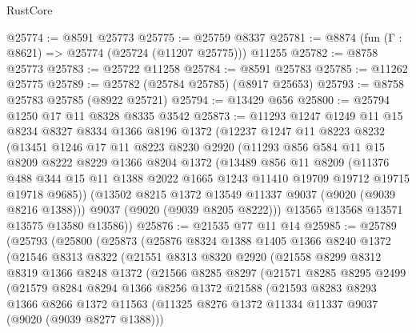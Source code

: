 \begin{lexlean}{RustCore}
\begin{coremodule}
@25774 := @8591 @25773
@25775 := @25759 @8337
@25781 := @8874 (fun (Γ : @8621) => @25774 (@25724 (@11207 @25775))) @11255
@25782 := @8758 @25773
@25783 := @25722 @11258
@25784 := @8591 @25783
@25785 := @11262 @25775
@25789 := @25782 (@25784 @25785) (@8917 @25653)
@25793 := @8758 @25783 @25785 (@8922 @25721)
@25794 := @13429 @656
@25800 := @25794 @1250 @17 @11 @8328 @8335 @3542
@25873 := @11293
    @1247
    @1249
    @11
    @15
    @8234
    @8327
    @8334
    @1366
    @8196
    @1372
    (@12237
      @1247
      @11
      @8223
      @8232
      (@13451
        @1246
        @17
        @11
        @8223
        @8230
        @2920
        (@11293
          @856
          @584
          @11
          @15
          @8209
          @8222
          @8229
          @1366
          @8204
          @1372
          (@13489
            @856
            @11
            @8209
            (@11376
              @488
              @344
              @15
              @11
              @1388
              @2022
              @1665
              @1243
              @11410
              @19709
              @19712
              @19715
              @19718
              @9685))
          (@13502 @8215 @1372 @13549 @11337 @9037 (@9020 (@9039 @8216 @1388)))
          @9037
          (@9020 (@9039 @8205 @8222)))
        @13565
        @13568
        @13571
        @13575
        @13580
        @13586))
@25876 := @21535 @77 @11 @14
@25985 := @25789
    (@25793
      (@25800
        (@25873
          (@25876
            @8324
            @1388
            @1405
            @1366
            @8240
            @1372
            (@21546
              @8313
              @8322
              (@21551
                @8313
                @8320
                @2920
                (@21558
                  @8299
                  @8312
                  @8319
                  @1366
                  @8248
                  @1372
                  (@21566
                    @8285
                    @8297
                    (@21571
                      @8285
                      @8295
                      @2499
                      (@21579
                        @8284
                        @8294
                        @1366
                        @8256
                        @1372
                        @21588
                        (@21593
                          @8283
                          @8293
                          @1366
                          @8266
                          @1372
                          @11563
                          (@11325 @8276 @1372 @11334 @11337 @9037 (@9020 (@9039 @8277 @1388)))

\end{coremodule}
\end{lexlean}
